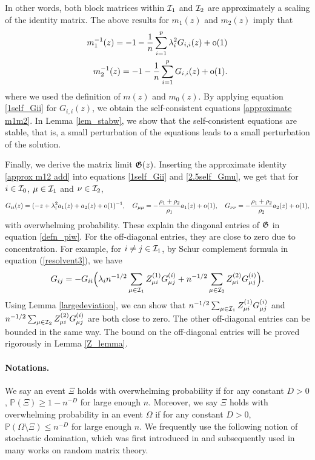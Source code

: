 In other words, both block matrices within $\cal I_1$ and $\cal I_2$ are approximately a scaling of the identity matrix.
The above results for $m_1(z)$ and $m_2(z)$ imply that
\begin{align*}
	m_1^{-1}(z) = -1- \frac{1}{n} \sum_{i=1}^p \lambda_i^2 G_{i,i}(z)+ \oo(1) \\
	m_2^{-1}(z) = -1- \frac{1}{n} \sum_{i=1}^p G_{i,i}(z)  + \oo(1).
\end{align*}
where we used the definition of $m(z)$ and $m_0(z)$.
By applying equation \eqref{1self_Gii} for $G_{i, i}(z)$, we obtain the self-consistent equations \ref{approximate m1m2}.
In Lemma \ref{lem_stabw}, we show that the self-consistent equations are stable, that is, a small perturbation of the equations leads to a small perturbation of the solution.


Finally, we derive the matrix limit $\Gi(z)$.
Inserting the approximate identity \eqref{approx m12 add} into equations \eqref{1self_Gii} and \eqref{2.5self_Gmu}, we get that for  $i \in \cal I_0$, $\mu \in \cal I_1$ and $\nu\in \cal I_2$,
$$G_{ii}(z)=(-z +\lambda_i^2 a_{1}(z) + a_2(z)+\oo(1)^{-1},\quad G_{\mu\mu}=-\frac{\rho_1+\rho_2}{\rho_1}a_{1}(z)+\oo(1),\quad G_{\nu\nu}=-\frac{\rho_1+\rho_2}{\rho_2}a_{2}(z)+\oo(1),$$
with overwhelming probability. These explain the diagonal entries of $\Gi$ in equation \eqref{defn_piw}. For the off-diagonal entries, they are close to zero due to concentration. For example, for $i\ne j\in \cal I_1$, by Schur complement formula in equation (\ref{resolvent3}), we have
$$G_{ij}=-G_{ii}\Big({\lambda_i}{n^{-1/2}}\sum_{\mu \in \cal I_1} Z^{(1)}_{\mu i} G^{(i)}_{\mu j} + {n^{-1/2}}\sum_{\mu \in \cal I_2} Z^{(2)}_{\mu i} G^{(i)}_{\mu j} \Big).$$
Using Lemma \ref{largedeviation}, we can show that $n^{-1/2}\sum_{\mu \in \cal I_1} Z^{(1)}_{\mu i} G^{(i)}_{\mu j}$ and $n^{-1/2}\sum_{\mu \in \cal I_2} Z^{(2)}_{\mu i} G^{(i)}_{\mu j}$ are both close to zero. The other off-diagonal entries can be bounded in the same way. The bound on the off-diagonal entries will be proved rigorously in Lemma \ref{Z_lemma}.


\paragraph{Notations.}
We say an event $\Xi$ holds with overwhelming probability if for any constant $D>0$, $\mathbb P(\Xi)\ge 1- n^{-D}$ for large enough $n$. Moreover, we say $\Xi$ holds with overwhelming probability in an event $\Omega$ if for any constant $D>0$, $\mathbb P(\Omega\setminus \Xi)\le n^{-D}$ for large enough $n$.
We frequently use the following notion of stochastic domination, which was first introduced in \cite{Average_fluc} and subsequently used in many works on random matrix theory.

